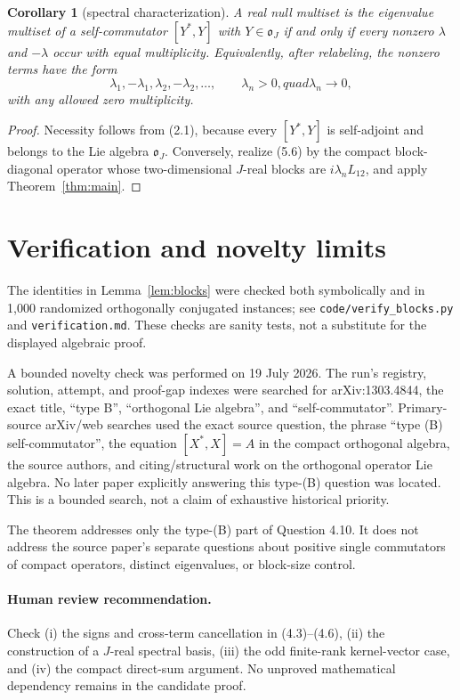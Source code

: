 \documentclass[11pt]{article}
\newtheorem{corollary}[theorem]{Corollary}
\newcommand{\ooJ}{\mathfrak o_J}
\newcommand{\1}{\mathbf 1}
\begin{document}
\begin{corollary}[spectral characterization]\label{cor:spectrum}
A real null multiset is the eigenvalue multiset of a self-commutator
$[Y^*,Y]$ with $Y\in\ooJ$ if and only if every nonzero $\lambda$ and
$-\lambda$ occur with equal multiplicity.  Equivalently, after relabeling,
the nonzero terms have the form
\[
 \lambda_1,-\lambda_1,\lambda_2,-\lambda_2,\ldots,
 \qquad \lambda_n>0,quad \lambda_n\longrightarrow0,        \tag{5.6}
\]
with any allowed zero multiplicity.
\end{corollary}

\begin{proof}
Necessity follows from (2.1), because every $[Y^*,Y]$ is self-adjoint and
belongs to the Lie algebra $\ooJ$.  Conversely, realize (5.6) by the compact
block-diagonal operator whose two-dimensional $J$-real blocks are
$i\lambda_nL_{12}$, and apply Theorem~\ref{thm:main}.
\end{proof}

\section{Verification and novelty limits}

The identities in Lemma~\ref{lem:blocks} were checked both symbolically and
in 1,000 randomized orthogonally conjugated instances; see
\texttt{code/verify\_blocks.py} and \texttt{verification.md}.  These checks
are sanity tests, not a substitute for the displayed algebraic proof.

A bounded novelty check was performed on 19 July 2026.  The run's registry,
solution, attempt, and proof-gap indexes were searched for arXiv:1303.4844,
the exact title, ``type B'', ``orthogonal Lie algebra'', and
``self-commutator''.  Primary-source arXiv/web searches used the exact source
question, the phrase ``type (B) self-commutator'', the equation $[X^*,X]=A$
in the compact orthogonal algebra, the source authors, and citing/structural
work on the orthogonal operator Lie algebra.  No later paper explicitly
answering this type-(B) question was located.  This is a bounded search, not a
claim of exhaustive historical priority.

The theorem addresses only the type-(B) part of Question 4.10.  It does not
address the source paper's separate questions about positive single
commutators of compact operators, distinct eigenvalues, or block-size control.

\paragraph{Human review recommendation.}
Check (i) the signs and cross-term cancellation in (4.3)--(4.6),
(ii) the construction of a $J$-real spectral basis, (iii) the odd finite-rank
kernel-vector case, and (iv) the compact direct-sum argument.  No unproved
mathematical dependency remains in the candidate proof.
\end{document}
